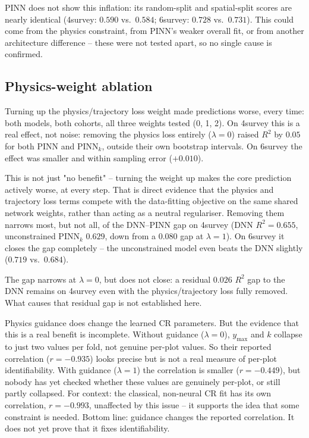 PINN does not show this inflation: its random-split and spatial-split scores are nearly identical
(4survey: $0.590$ vs.\ $0.584$; 6survey: $0.728$ vs.\ $0.731$). This could come from the physics
constraint, from PINN's weaker overall fit, or from another architecture difference -- these were
not tested apart, so no single cause is confirmed.


\subsection{Physics-weight ablation}

Turning up the physics/trajectory loss weight made predictions worse, every time: both models,
both cohorts, all three weights tested (0, 1, 2). On 4survey this is a real effect, not noise:
removing the physics loss entirely ($\lambda=0$) raised $R^2$ by $0.05$ for both PINN and
PINN$_k$, outside their own bootstrap intervals. On 6survey the effect was smaller and within
sampling error ($+0.010$).

This is not just "no benefit" -- turning the weight up makes the core prediction actively worse,
at every step. That is direct evidence that the physics and trajectory loss terms compete with the
data-fitting objective on the same shared network weights, rather than acting as a neutral
regulariser. Removing them narrows most, but not all, of the DNN--PINN gap on 4survey (DNN
$R^2=0.655$, unconstrained PINN$_k$ $0.629$, down from a $0.080$ gap at $\lambda=1$). On 6survey it
closes the gap completely -- the unconstrained model even beats the DNN slightly ($0.719$ vs.\
$0.684$).

The gap narrows at $\lambda=0$, but does not close: a residual $0.026$ $R^2$ gap to the DNN
remains on 4survey even with the physics/trajectory loss fully removed. What causes that residual
gap is not established here.

Physics guidance does change the learned CR parameters. But the evidence that this is a real
benefit is incomplete. Without guidance ($\lambda=0$), $y_{\max}$ and $k$ collapse to just two
values per fold, not genuine per-plot values. So their reported correlation ($r=-0.935$) looks
precise but is not a real measure of per-plot identifiability. With guidance ($\lambda=1$) the
correlation is smaller ($r=-0.449$), but nobody has yet checked whether these values are genuinely
per-plot, or still partly collapsed. For context: the classical, non-neural CR fit has its own
correlation, $r=-0.993$, unaffected by this issue -- it supports the idea that some constraint is
needed. Bottom line: guidance changes the reported correlation. It does not yet prove that it
fixes identifiability.

